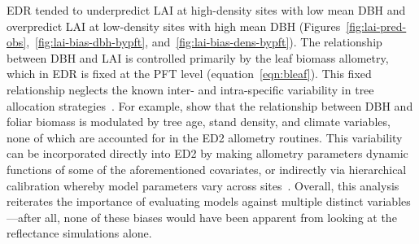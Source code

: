 EDR tended to underpredict LAI at high-density sites with low mean DBH and overpredict LAI at low-density sites with high mean DBH (Figures~\ref{fig:lai-pred-obs},~\ref{fig:lai-bias-dbh-bypft}, and~\ref{fig:lai-bias-dens-bypft}).
The relationship between DBH and LAI is controlled primarily by the leaf biomass allometry, which in EDR is fixed at the PFT level (equation~\ref{eqn:bleaf}).
This fixed relationship neglects the known inter- and intra-specific variability in tree allocation strategies~\citep{forrester2017generalized, dolezal2020contrasting}.
For example, \citet{forrester2017generalized} show that the relationship between DBH and foliar biomass is modulated by tree age, stand density, and climate variables, none of which are accounted for in the ED2 allometry routines.
This variability can be incorporated directly into ED2 by making allometry parameters dynamic functions of some of the aforementioned covariates,
or indirectly via hierarchical calibration whereby model parameters vary across sites~\citep{dietze2008capturing}.
Overall, this analysis reiterates the importance of evaluating models against multiple distinct variables---after all, none of these biases would have been apparent from looking at the reflectance simulations alone.

